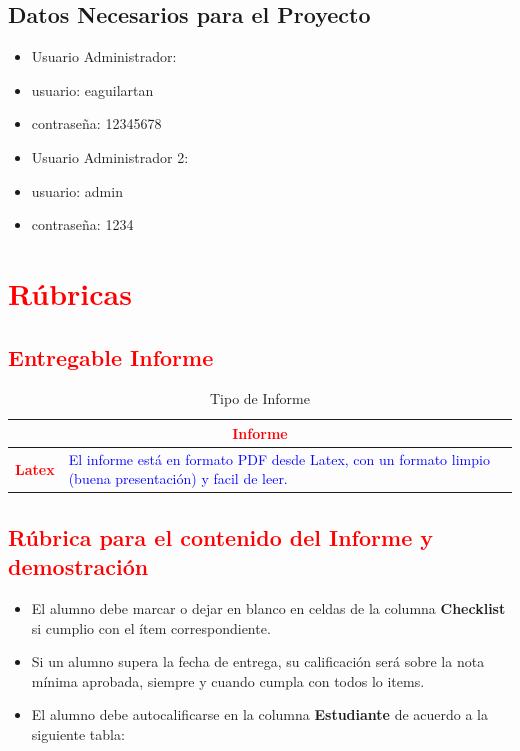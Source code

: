 \documentclass{article}
\begin{document}
\begin{itemize}
   
\subsection{Datos Necesarios para el Proyecto}
	\begin{itemize}
		\item Usuario Administrador: 
        \item usuario: eaguilartan  
        \item contraseña: 12345678
        \item Usuario Administrador 2: 
        \item usuario: admin
        \item contraseña:   1234
	\end{itemize}	
	
    
 
	\section{\textcolor{red}{Rúbricas}}
	
	\subsection{\textcolor{red}{Entregable Informe}}
	\begin{table}[H]
		\caption{Tipo de Informe}
		\setlength{\tabcolsep}{0.5em} %
		{\renewcommand{\arraystretch}{1.5}%
		\begin{tabular}{|p{3cm}|p{12cm}|}
			\hline
			\multicolumn{2}{|c|}{\textbf{\textcolor{red}{Informe}}}  \\
			\hline 
			\textbf{\textcolor{red}{Latex}} & \textcolor{blue}{El informe está en formato PDF desde Latex,  con un formato limpio (buena presentación) y facil de leer.}   \\ 
			\hline 
			
			
		\end{tabular}
	}
	\end{table}
	
	\clearpage
	
	\subsection{\textcolor{red}{Rúbrica para el contenido del Informe y demostración}}
	\begin{itemize}			
		\item El alumno debe marcar o dejar en blanco en celdas de la columna \textbf{Checklist} si cumplio con el ítem correspondiente.
		\item Si un alumno supera la fecha de entrega,  su calificación será sobre la nota mínima aprobada, siempre y cuando cumpla con todos lo items.
		\item El alumno debe autocalificarse en la columna \textbf{Estudiante} de acuerdo a la siguiente tabla:
	

\end{itemize}
\end{itemize}
\end{document}
